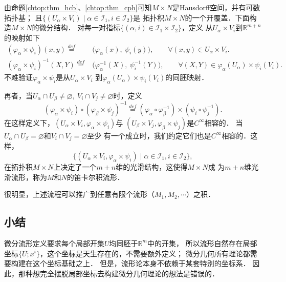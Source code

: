 由命题\ref{chtop:thm_hcb}、\ref{chtop:thm_cph}可知$M\times N$是Hausdorff空间，并有可数拓扑基；
且$\{(U_\alpha\times V_i)\mid \alpha\in \mathscr{I}_1,i\in \mathscr{I}_2\} $是
拓扑积$M\times N$的一个开覆盖．下面构造$M\times N$的微分结构．
对每一对指标$\{(\alpha,i)\in \mathscr{I}_1 \times \mathscr{I}_2\}$，定义
从$U_\alpha\times V_i$到$\mathbb{R}^{m+n}$的映射如下
\begin{align*}
    (\varphi_\alpha \times \psi_i)(x,y)\overset{def}{=}&\bigl(\varphi_\alpha(x),\ \psi_i(y)\bigr),
    \qquad \forall (x,y)\in U_\alpha\times V_i . \\
    (\varphi_\alpha \times \psi_i)^{-1}(X,Y)\overset{def}{=}&\bigl(\varphi_\alpha^{-1}(X),\ 
    \psi_i^{-1}(Y)\bigr),  \qquad \forall (X,Y)\in \varphi_\alpha(U_\alpha)\times \psi_i(V_i) .
\end{align*}
不难验证$\varphi_\alpha \times \psi_i$是从$U_\alpha\times V_i$
到$\varphi_\alpha(U_\alpha)\times \psi_i(V_i)$的同胚映射．


再者，当$U_\alpha \cap U_\beta \neq \varnothing,\ V_i\cap V_j\neq \varnothing$时，定义
\begin{equation}
    (\varphi_\alpha \times \psi_i)\circ (\varphi_\beta \times \psi_j)^{-1}
    \overset{def}{=}(\varphi_\alpha\circ \varphi_\beta^{-1})\times
    (\psi_i\circ\psi_j^{-1}) .
\end{equation}
在这样定义下，$(U_\alpha\times V_i , \varphi_\alpha \times \psi_i)$与
$(U_\beta\times V_j , \varphi_\beta \times \psi_j)$是$C^\infty$相容的．
当$U_\alpha \cap U_\beta = \varnothing$和$V_i\cap V_j = \varnothing$至少
有一个成立时，我们约定它们也是$C^\infty$相容的．这样，
\begin{equation}
    \{(U_\alpha\times V_i , \varphi_\alpha \times \psi_i) \mid
    \alpha\in \mathscr{I}_1,i\in \mathscr{I}_2\} ,
\end{equation}
在拓扑积$M\times N$上决定了一个$m+n$维的光滑结构，这使得$M\times N$成
为$m+n$维光滑流形，称为$M$和$N$的笛卡尔{\heiti 积流形}．



很明显，上述流程可以推广到任意有限个流形（$M_1,M_2,\cdots$）之积．



\subsection{小结}\label{chdm:sec_tmpdmcon}
微分流形定义要求每个局部开集$U$均同胚于$\mathbb{R}^m$中的开集，
所以流形自然存在局部坐标$\{U;x^i\}$，这个坐标是天生存在的，不需要额外定义；
微分几何所有理论都需要构建在这个坐标基础之上．
但是，流形论本身不依赖于某套特别的坐标系．
因此，那种想完全摆脱局部坐标去构建微分几何理论的想法是错误的．

